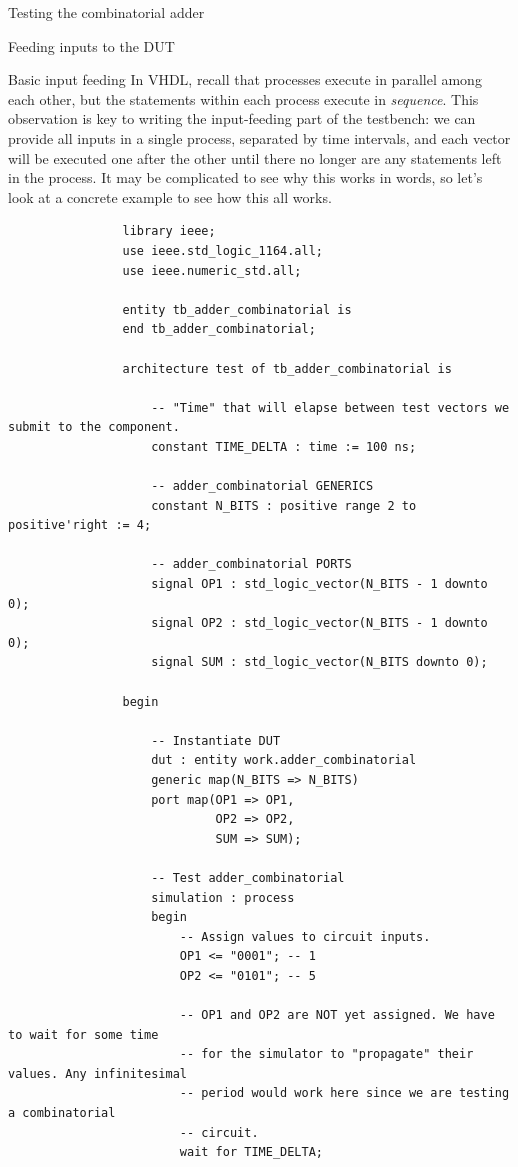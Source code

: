 \documentclass[a4paper, 12pt, onecolumn]{article}
\begin{document}
\begin{section}{Testing the combinatorial adder}
\begin{subsection}{Feeding inputs to the DUT}
\begin{subsubsection}{Basic input feeding}
            In VHDL, recall that processes execute in parallel among each other, but the statements within each process execute in \emph{sequence}. This observation is key to writing the input-feeding part of the testbench: we can provide all inputs in a single process, separated by time intervals, and each vector will be executed one after the other until there no longer are any statements left in the process. It may be complicated to see why this works in words, so let's look at a concrete example to see how this all works.

            \begin{verbatim}
                library ieee;
                use ieee.std_logic_1164.all;
                use ieee.numeric_std.all;

                entity tb_adder_combinatorial is
                end tb_adder_combinatorial;

                architecture test of tb_adder_combinatorial is

                    -- "Time" that will elapse between test vectors we submit to the component.
                    constant TIME_DELTA : time := 100 ns;

                    -- adder_combinatorial GENERICS
                    constant N_BITS : positive range 2 to positive'right := 4;

                    -- adder_combinatorial PORTS
                    signal OP1 : std_logic_vector(N_BITS - 1 downto 0);
                    signal OP2 : std_logic_vector(N_BITS - 1 downto 0);
                    signal SUM : std_logic_vector(N_BITS downto 0);

                begin

                    -- Instantiate DUT
                    dut : entity work.adder_combinatorial
                    generic map(N_BITS => N_BITS)
                    port map(OP1 => OP1,
                             OP2 => OP2,
                             SUM => SUM);

                    -- Test adder_combinatorial
                    simulation : process
                    begin
                        -- Assign values to circuit inputs.
                        OP1 <= "0001"; -- 1
                        OP2 <= "0101"; -- 5

                        -- OP1 and OP2 are NOT yet assigned. We have to wait for some time
                        -- for the simulator to "propagate" their values. Any infinitesimal
                        -- period would work here since we are testing a combinatorial
                        -- circuit.
                        wait for TIME_DELTA;


\end{verbatim}
\end{subsubsection}
\end{subsection}
\end{section}
\end{document}
